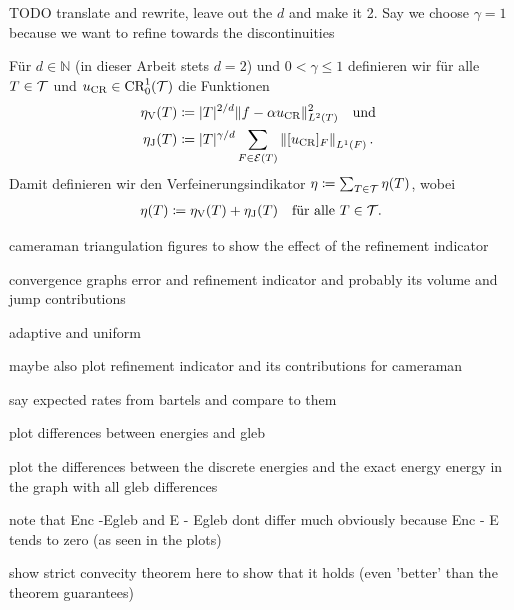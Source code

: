\begin{frame}
  TODO translate and rewrite, leave out the $d$ and make it 2. Say we choose
  $\gamma=1$ because we want to refine towards the discontinuities

  \begin{definition}[Verfeinerungsindikator]
    Für $d\in\mathbb{N}$ (in dieser Arbeit stets $d=2$) und $0<\gamma\leq 1$
    definieren wir für alle $T\in\mathcal{T}$ und $u_\textup{CR}\in\textup{CR}^1_0(\mathcal{T})$ die
    Funktionen
    \begin{align*}
      \eta_\text{V}(T)
      &\coloneqq
      |T|^{2/d}\Vert f-\alpha u_\textup{CR}\Vert^2_{L^2(T)}\quad\text{und }\\
      \eta_\text{J}(T)
      &\coloneqq
      |T|^{\gamma/d}\sum_{F\in\mathcal{E}(T)}\left\Vert [u_\textup{CR}]_F\right\Vert_{L^1(F)}.
    \end{align*} 
    Damit definieren wir den Verfeinerungsindikator
    $\eta\coloneqq\sum_{T\in\mathcal{T}}\eta(T)$, wobei
    \begin{align*} 
      \eta (T)
      \coloneqq
      \eta_\text{V}(T) + \eta_\text{J}(T)\quad\text{für alle } T\in\mathcal{T}.
    \end{align*} 
  \end{definition}
\end{frame}

\begin{frame}
  cameraman triangulation figures to show the effect of the refinement 
  indicator
\end{frame}

\begin{frame}
  convergence graphs error and refinement indicator and probably its volume
  and jump contributions

  adaptive and uniform

  maybe also plot refinement indicator and its contributions for cameraman

  say expected rates from bartels and compare to them
\end{frame}


\begin{frame}
  plot differences between energies and gleb 

  plot the differences between the discrete energies and the exact energy
  energy in the graph with all gleb differences

  note that Enc -Egleb and E - Egleb dont differ much obviously because
  Enc - E tends to zero (as seen in the plots)

  show strict convecity theorem here to show that it holds (even 'better' than
  the theorem guarantees)
\end{frame}

